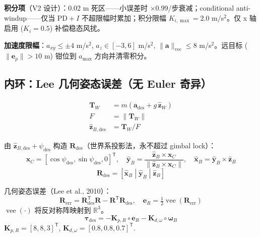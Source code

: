 \documentclass[12pt,a4paper]{article}
\begin{document}
\textbf{积分项}（V2 设计）：0.02 m 死区——小误差时 $\times 0.99$/步衰减；conditional anti-windup——仅当 $\text{PD} + I$ 不超限幅时累加；积分限幅 $K_{i,\max}=2.0$ m/s$^2$。仅 x 轴启用 ($K_i=0.5$) 补偿稳态风扰。

\textbf{加速度限幅}：$a_{xy} \leq \pm 4$ m/s$^2$, $a_z \in [-3, 6]$ m/s$^2$, $\|\mathbf{a}\|_{\text{vec}} \leq 8$ m/s$^2$。远目标 ($\|\mathbf{e}_p\| > 10$ m) 钳位到 $a_{\max}$ 方向并清零积分。

\subsection{内环：Lee 几何姿态误差（无 Euler 奇异）}

\begin{align}
  \mathbf{T}_W &= m(\mathbf{a}_{\text{des}} + g\,\hat{\mathbf{z}}_W) \label{eq:thrust_w} \\
  F &= \|\mathbf{T}_W\| \label{eq:F} \\
  \hat{\mathbf{z}}_{B,\text{des}} &= \mathbf{T}_W / F \label{eq:zb}
\end{align}

由 $\hat{\mathbf{z}}_{B,\text{des}} + \psi_{\text{des}}$ 构造 $\mathbf{R}_{\text{des}}$（世界系投影法，永不超过 gimbal lock）：
\begin{equation}
  \mathbf{x}_C = [\cos\psi_{\text{des}},\sin\psi_{\text{des}},0]^{\mathsf{T}},\quad
  \hat{\mathbf{y}}_B = \frac{\hat{\mathbf{z}}_B \times \mathbf{x}_C}
    {\|\hat{\mathbf{z}}_B \times \mathbf{x}_C\|},\quad
  \hat{\mathbf{x}}_B = \hat{\mathbf{y}}_B \times \hat{\mathbf{z}}_B
\end{equation}
\begin{equation}
  \mathbf{R}_{\text{des}} = [\hat{\mathbf{x}}_B\;|\;\hat{\mathbf{y}}_B\;|\;\hat{\mathbf{z}}_B]
\end{equation}

几何姿态误差（Lee et al., 2010）：
\begin{equation}
  \mathbf{R}_{\text{err}} = \mathbf{R}_{\text{des}}^{\mathsf{T}}\mathbf{R}
    - \mathbf{R}^{\mathsf{T}}\mathbf{R}_{\text{des}},\quad
  \mathbf{e}_R = \tfrac{1}{2}\operatorname{vee}(\mathbf{R}_{\text{err}})
  \label{eq:eR}
\end{equation}
$\operatorname{vee}(\cdot)$ 将反对称阵映射到 $\mathbb{R}^3$。
\begin{equation}
  \boldsymbol{\tau}_{\text{des}} = -\mathbf{K}_{p,R} \circ \mathbf{e}_R
    - \mathbf{K}_{d,\omega} \circ \boldsymbol{\omega}_B
  \label{eq:tau_des}
\end{equation}
$\mathbf{K}_{p,R} = [8,8,3]^{\mathsf{T}}$, $\mathbf{K}_{d,\omega} = [0.8,0.8,0.7]^{\mathsf{T}}$.
\end{document}
